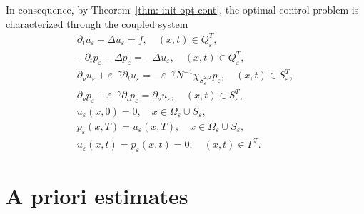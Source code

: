 \documentclass[10pt,a4paper]{amsart}
\numberwithin{equation}{section}
\begin{document}
In consequence, by Theorem~\ref{thm: init opt cont}, the optimal control
problem is characterized through the coupled system
\begin{equation}
\begin{gathered}
\partial _{t}u_{\varepsilon }-\Delta u_{\varepsilon }=f, \quad (x,t)\in
Q_{\varepsilon }^{T}, \\
-\partial _{t}p_{\varepsilon }-\Delta p_{\varepsilon }=-\Delta
u_{\varepsilon }, \quad (x,t)\in Q_{\varepsilon }^{T}, \\
\partial _{\nu }u_{\varepsilon }+\varepsilon ^{-\gamma }\partial
_{t}u_{\varepsilon }=-\varepsilon ^{-\gamma }N^{-1}\chi _{S_{\varepsilon
}^{2, T}}p_{\varepsilon }, \quad (x,t)\in S_{\varepsilon }^{T}, \\
\partial _{\nu }p_{\varepsilon }-\varepsilon ^{-\gamma }\partial
_{t}p_{\varepsilon }=\partial _{\nu }u_{\varepsilon }, \quad (x,t)\in
S_{\varepsilon }^{T}, \\
u_{\varepsilon }(x,0)=0, \quad x\in \Omega _{\varepsilon }\cup S_{\varepsilon
}, \\
p_{\varepsilon }(x,T)=u_{\varepsilon }(x,T), \quad x\in \Omega _{\varepsilon
}\cup S_{\varepsilon }, \\
u_{\varepsilon }(x,t)=p_{\varepsilon }(x,t)=0, \quad (x,t)\in \Gamma ^{T}.%
\end{gathered}  \label{init coupled prob}
\end{equation}

\section{A priori estimates}
\end{document}
